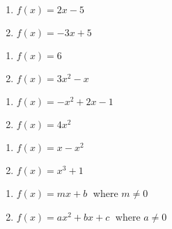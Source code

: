 \begin{multicols}{2}

\begin{enumerate}
\setcounter{enumi}{\value{HW}}

\item $f(x) = 2x - 5$ \label{diffquotexerfirsta}
\item $f(x) = -3x + 5$

\setcounter{HW}{\value{enumi}}
\end{enumerate}
\end{multicols}

\begin{multicols}{2}
\begin{enumerate}
\setcounter{enumi}{\value{HW}}

\item $f(x) = 6$
\item $f(x) = 3x^2 - x$

\setcounter{HW}{\value{enumi}}
\end{enumerate}
\end{multicols}

\begin{multicols}{2}
\begin{enumerate}
\setcounter{enumi}{\value{HW}}

\item $f(x) = -x^2 + 2x - 1$
\item  $f(x) = 4x^2$ 

\setcounter{HW}{\value{enumi}}
\end{enumerate}
\end{multicols}

\begin{multicols}{2}
\begin{enumerate}
\setcounter{enumi}{\value{HW}}

\item  $f(x) = x-x^2$ 
\item $f(x) = x^{3} + 1$

\setcounter{HW}{\value{enumi}}
\end{enumerate}
\end{multicols}

\begin{multicols}{2}
\begin{enumerate}
\setcounter{enumi}{\value{HW}}

\item $f(x) = mx + b\;$ where $m \neq 0$
\item $f(x) = ax^{2} + bx + c\;$ where $a \neq 0$  \label{diffquotexerlasta}

\setcounter{HW}{\value{enumi}}
\end{enumerate}
\end{multicols}


